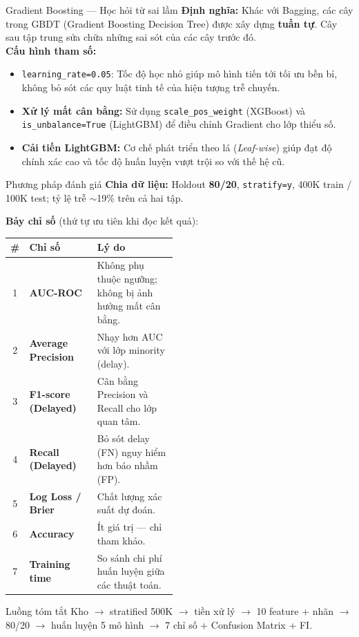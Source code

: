 \begin{frame}{Gradient Boosting --- Học hỏi từ sai lầm}
  \textbf{Định nghĩa:} Khác với Bagging, các cây trong GBDT (Gradient Boosting Decision Tree) được xây dựng \textbf{tuần tự}. Cây sau tập trung sửa chữa những sai sót của các cây trước đó.
  \vspace{2mm}
  \\
  \textbf{Cấu hình tham số:}
  \begin{itemize}
    \item \texttt{learning\_rate=0.05}: Tốc độ học nhỏ giúp mô hình tiến tới tối ưu bền bỉ, không bỏ sót các quy luật tinh tế của hiện tượng trễ chuyến.
    \item \textbf{Xử lý mất cân bằng:} Sử dụng \texttt{scale\_pos\_weight} (XGBoost) và \texttt{is\_unbalance=True} (LightGBM) để điều chỉnh Gradient cho lớp thiểu số.
    \item \textbf{Cải tiến LightGBM:} Cơ chế phát triển theo lá (\textit{Leaf-wise}) giúp đạt độ chính xác cao và tốc độ huấn luyện vượt trội so với thế hệ cũ.
  \end{itemize}
\end{frame}

\begin{frame}[shrink=3]{Phương pháp đánh giá}
\small
\textbf{Chia dữ liệu:} Holdout \textbf{80/20}, \texttt{stratify=y}, 400K train / 100K test; tỷ lệ trễ $\sim$19\% trên cả hai tập.

\textbf{Bảy chỉ số} (thứ tự ưu tiên khi đọc kết quả):

\begin{center}
\scriptsize\slideTablePad
\renewcommand{\arraystretch}{1.28}
\begin{tabular}{|c|l|p{0.48\linewidth}|}
\hline
\textbf{\#} & \textbf{Chỉ số} & \textbf{Lý do} \\
\hline
1 & \textbf{AUC-ROC} & Không phụ thuộc ngưỡng; không bị ảnh hưởng mất cân bằng. \\
\hline
2 & \textbf{Average Precision} & Nhạy hơn AUC với lớp minority (delay). \\
\hline
3 & \textbf{F1-score (Delayed)} & Cân bằng Precision và Recall cho lớp quan tâm. \\
\hline
4 & \textbf{Recall (Delayed)} & Bỏ sót delay (FN) nguy hiểm hơn báo nhầm (FP). \\
\hline
5 & \textbf{Log Loss / Brier} & Chất lượng xác suất dự đoán. \\
\hline
6 & \textbf{Accuracy} & Ít giá trị --- chỉ tham khảo. \\
\hline
7 & \textbf{Training time} & So sánh chi phí huấn luyện giữa các thuật toán. \\
\hline
\end{tabular}
\end{center}
\normalsize

\vspace{2mm}
\begin{block}{Luồng tóm tắt}
Kho $\to$ stratified 500K $\to$ tiền xử lý $\to$ 10 feature + nhãn $\to$ 80/20 $\to$ huấn luyện 5 mô hình $\to$ 7 chỉ số + Confusion Matrix + FI.
\end{block}
\end{frame}

